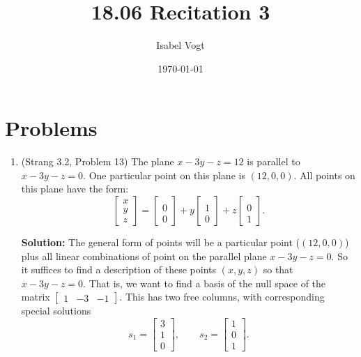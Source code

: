 \documentclass[11pt]{article}
\title{18.06 Recitation 3}
\author{Isabel Vogt}
\date{\today}                                           %
\begin{document}
\maketitle
\section{Problems}

\begin{enumerate}




\item (Strang 3.2, Problem 13)  The plane $x - 3y -z =12$ is parallel to $x-3y-z=0$.  One particular point on this plane is $(12,0,0)$.  All points on this plane have the form:
\[\begin{bmatrix} x \\ y \\ z \end{bmatrix} = \begin{bmatrix}  \\ 0 \\0 \end{bmatrix} + y\begin{bmatrix}  \\ 1 \\ 0 \end{bmatrix} + z \begin{bmatrix}  \\ 0 \\ 1 \end{bmatrix}.\]

\textbf{Solution:} The general form of points will be a particular point ($(12,0,0)$) plus all linear combinations of point on the parallel plane $x-3y-z=0$.  So it suffices to find a description of these points $(x,y,z)$ so that $x - 3y -z = 0$.  That is, we want to find a basis of the null space of the matrix $\begin{bmatrix} 1 & -3 & -1 \end{bmatrix}$.  This has two free columns, with corresponding special solutions
\[ s_1 = \begin{bmatrix} 3 \\ 1 \\ 0 \end{bmatrix}, \qquad s_2 = \begin{bmatrix} 1 \\ 0 \\ 1 \end{bmatrix}. \]


\end{enumerate}
\end{document}
